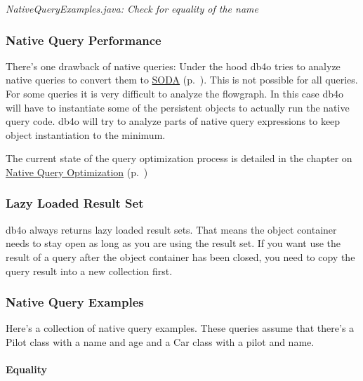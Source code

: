 {\small\itshape NativeQueryExamples.java: Check for equality of the name\par}
\medskip

\subsubsection*{Native Query Performance}

There's one drawback of native queries: Under the hood db4o tries to analyze native queries to convert them to \hyperref[ref:basics-querying-soda-query]{SODA} (p.~\pageref{ref:basics-querying-soda-query}). This is not possible for all queries. For some queries it is very difficult to analyze the flowgraph. In this case db4o will have to instantiate some of the persistent objects to actually run the native query code. db4o will try to analyze parts of native query expressions to keep object instantiation to the minimum.

The current state of the query optimization process is detailed in the chapter on \hyperref[ref:basics-querying-native-queries-native-query-optimization]{Native Query Optimization} (p.~\pageref{ref:basics-querying-native-queries-native-query-optimization})

\subsubsection*{Lazy Loaded Result Set}

db4o always returns lazy loaded result sets. That means the object container needs to stay open as long as you are using the result set. If you want use the result of a query after the object container has been closed, you need to copy the query result into a new collection first.

\subsubsection{Native Query Examples}
\label{ref:basics-querying-native-queries-native-query-examples}

Here's a collection of native query examples. These queries assume that there's a Pilot class with a name and age and a Car class with a pilot and name.

\paragraph{Equality}
\label{ref:basics-querying-native-queries-native-query-examples:equality}

